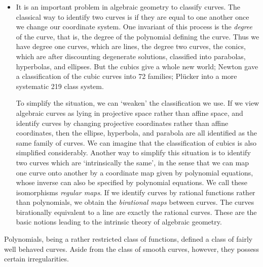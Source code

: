\begin{itemize}
    \item It is an important problem in algebraic geometry to classify curves. The classical way to identify two curves is if they are equal to one another once we change our coordinate system. One invariant of this process is the \emph{degree} of the curve, that is, the degree of the polynomial defining the curve. Thus we have degree one curves, which are lines, the degree two curves, the conics, which are after discounting degenerate solutions, classified into parabolas, hyperbolas, and ellipses. But the cubics give a whole new world; Newton gave a classification of the cubic curves into 72 families; Pl\"{u}cker into a more systematic 219 class system.

    To simplify the situation, we can `weaken' the classification we use. If we view algebraic curves as lying in projective space rather than affine space, and identify curves by changing projective coordinates rather than affine coordinates, then the ellipse, hyperbola, and parabola are all identified as the same family of curves. We can imagine that the classification of cubics is also simplified considerably. Another way to simplify this situation is to identify two curves which are `intrinsically the same', in the sense that we can map one curve onto another by a coordinate map given by polynomial equations, whose inverse can also be specified by polynomial equations. We call these isomorphisms \emph{regular maps}. If we identify curves by rational functions rather than polynomials, we obtain the \emph{birational maps} between curves. The curves birationally equivalent to a line are exactly the rational curves. These are the basic notions leading to the intrinsic theory of algebraic geometry.
\end{itemize}
%
Polynomials, being a rather restricted class of functions, defined a class of fairly well behaved curves. Aside from the class of smooth curves, however, they possess certain irregularities.
%
